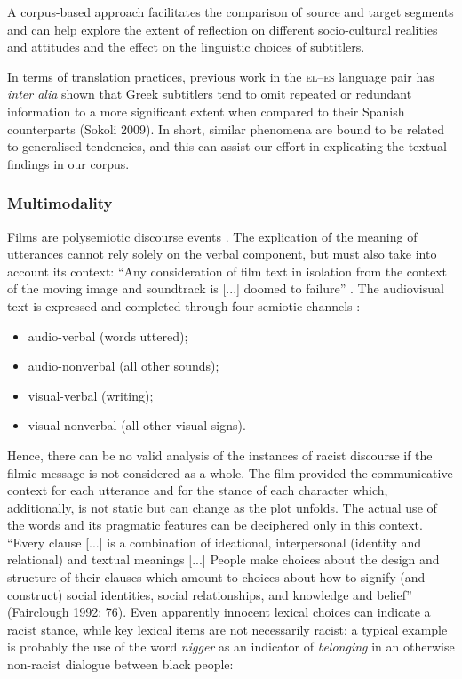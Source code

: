 \documentclass[output=paper]{LSP/langsci}
\begin{document}
A corpus-based approach facilitates the comparison of source and target segments and can help explore the extent of reflection on different socio-cultural realities and attitudes and the effect on the linguistic choices of subtitlers.

In terms of translation practices, previous work in the \textsc{el}--\textsc{es} language pair has \textit{inter alia} shown that Greek subtitlers tend to omit repeated or redundant information to a more significant extent when compared to their Spanish counterparts (Sokoli 2009). In short, similar phenomena are bound to be related to generalised tendencies, and this can assist our effort in explicating the textual findings in our corpus.

\subsubsection{Multimodality}
Films are polysemiotic discourse events \citep{Gottlieb2005}. The explication of the meaning of utterances cannot rely solely on the verbal component, but must also take into account its context: “Any consideration of film text in isolation from the context of the moving image and soundtrack is [...] doomed to failure” \citep[23]{Mason2001}.
The audiovisual text is expressed and completed through four semiotic channels \citep{Zabalbeascoa2008}:

\begin{itemize}
\item audio-verbal (words uttered);
\item audio-nonverbal (all other sounds);
\item visual-verbal (writing);
\item visual-nonverbal (all other visual signs).
\end{itemize}

Hence, there can be no valid analysis of the instances of racist discourse if the filmic message is not considered as a whole. The film provided the communicative context for each utterance and for the stance of each character which, additionally, is not static but can change as the plot unfolds. The actual use of the words and its pragmatic features can be deciphered only in this context. “Every clause [...] is a combination of ideational, interpersonal (identity and relational) and textual meanings [...] People make choices about the design and structure of their clauses which amount to choices about how to signify (and construct) social identities, social relationships, and knowledge and belief” (Fairclough 1992: 76). Even apparently innocent lexical choices can indicate a racist stance, while key lexical items are not necessarily racist: a typical example is probably the use of the word \textit{nigger} as an indicator of \textit{belonging} in an otherwise non-racist dialogue between black people:
\end{document}
